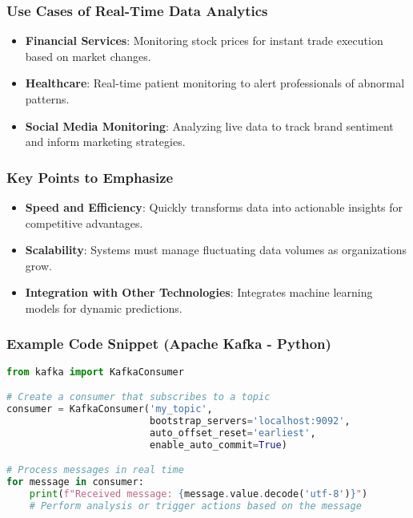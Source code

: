 \documentclass[aspectratio=169]{beamer}
\begin{document}
\begin{frame}
    \frametitle{Use Cases of Real-Time Data Analytics}
    \begin{itemize}
        \item \textbf{Financial Services}: Monitoring stock prices for instant trade execution based on market changes.

        \item \textbf{Healthcare}: Real-time patient monitoring to alert professionals of abnormal patterns.

        \item \textbf{Social Media Monitoring}: Analyzing live data to track brand sentiment and inform marketing strategies.
    \end{itemize}
\end{frame}

\begin{frame}
    \frametitle{Key Points to Emphasize}
    \begin{itemize}
        \item \textbf{Speed and Efficiency}: Quickly transforms data into actionable insights for competitive advantages.

        \item \textbf{Scalability}: Systems must manage fluctuating data volumes as organizations grow.

        \item \textbf{Integration with Other Technologies}: Integrates machine learning models for dynamic predictions.
    \end{itemize}
\end{frame}

\begin{frame}[fragile]
    \frametitle{Example Code Snippet (Apache Kafka - Python)}
    \begin{lstlisting}[language=Python]
from kafka import KafkaConsumer

# Create a consumer that subscribes to a topic
consumer = KafkaConsumer('my_topic', 
                         bootstrap_servers='localhost:9092',
                         auto_offset_reset='earliest',
                         enable_auto_commit=True)

# Process messages in real time
for message in consumer:
    print(f"Received message: {message.value.decode('utf-8')}")
    # Perform analysis or trigger actions based on the message
    \end{lstlisting}
\end{frame}
\end{document}
